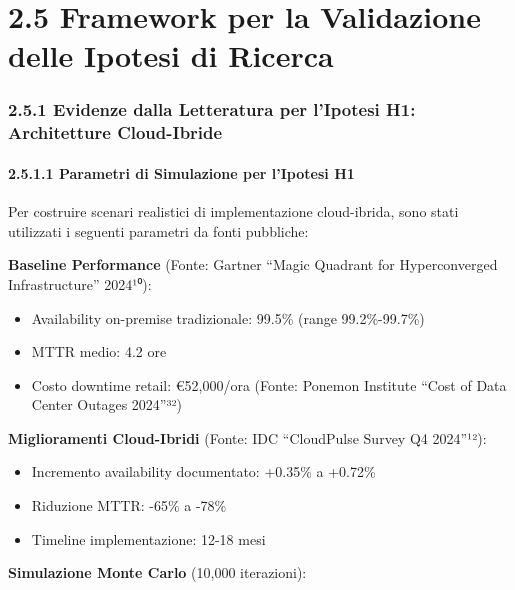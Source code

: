 \documentclass{report}
\providecommand{\tightlist}{%
  \setlength{\itemsep}{0pt}\setlength{\parskip}{0pt}
}
\begin{document}
\section{2.5 Framework per la Validazione delle Ipotesi di
Ricerca}\label{framework-per-la-validazione-delle-ipotesi-di-ricerca}

\subsubsection{2.5.1 Evidenze dalla Letteratura per l'Ipotesi H1:
Architetture
Cloud-Ibride}\label{evidenze-dalla-letteratura-per-lipotesi-h1-architetture-cloud-ibride}

\paragraph{2.5.1.1 Parametri di Simulazione per l'Ipotesi
H1}\label{parametri-di-simulazione-per-lipotesi-h1}

Per costruire scenari realistici di implementazione cloud-ibrida, sono
stati utilizzati i seguenti parametri da fonti pubbliche:

\textbf{Baseline Performance} (Fonte: Gartner ``Magic Quadrant for
Hyperconverged Infrastructure'' 2024¹⁰):

\begin{itemize}
\tightlist
\item
  Availability on-premise tradizionale: 99.5\% (range 99.2\%-99.7\%)\\
\item
  MTTR medio: 4.2 ore\\
\item
  Costo downtime retail: €52,000/ora (Fonte: Ponemon Institute ``Cost of
  Data Center Outages 2024''³²)
\end{itemize}

\textbf{Miglioramenti Cloud-Ibridi} (Fonte: IDC ``CloudPulse Survey Q4
2024''¹²):

\begin{itemize}
\tightlist
\item
  Incremento availability documentato: +0.35\% a +0.72\%\\
\item
  Riduzione MTTR: -65\% a -78\%\\
\item
  Timeline implementazione: 12-18 mesi
\end{itemize}

\textbf{Simulazione Monte Carlo} (10,000 iterazioni):
\end{document}
